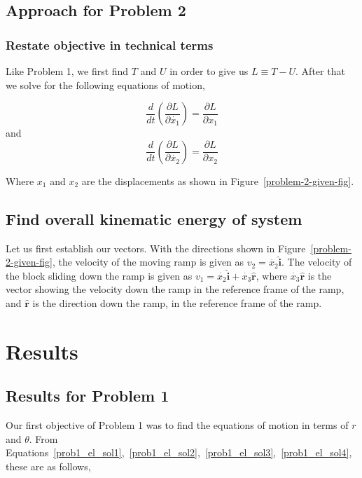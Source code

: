 \documentclass[conference]{IEEEtran}
\begin{document}
\subsection{Approach for Problem 2}

\subsubsection{Restate objective in technical terms}
Like Problem 1, we first find $T$ and $U$ in order to give us
$L \equiv T - U$. After that we solve for the following
equations of motion,

\begin{equation} \label{prob2_eq_motion_x1}
    \frac{d}{dt} \left(\frac{\partial L}{\partial \dot{x_1}}\right) = \frac{\partial L}{ \partial x_1}
\end{equation}
and
\begin{equation} \label{prob2_eq_motion_x2}
    \frac{d}{dt} \left(\frac{\partial L}{\partial \dot{x_2}}\right) = \frac{\partial L}{ \partial x_2}
\end{equation}

Where $x_1$ and $x_2$ are the displacements as shown in Figure~\ref{problem-2-given-fig}.

\subsection{Find overall kinematic energy of system}

Let us first establish our vectors. With the directions shown in Figure~\ref{problem-2-given-fig},
the velocity of the moving ramp is given as $v_2 = \dot{x_2} \hat{\textbf{i}}$. The
velocity of the block sliding down the ramp is given as $v_1 = \dot{x_2} \hat{\textbf{i}} + \dot{x_3}\hat{\textbf{r}}$,
where $\dot{x_3}\hat{\textbf{r}}$ is the vector showing the velocity down the ramp in the reference frame of the
ramp, and $\hat{\textbf{r}}$ is the direction down the ramp, in the reference frame of the ramp.

\section{Results}

\subsection{Results for Problem 1}

Our first objective of Problem 1 was to find the equations of motion in terms
of $r$ and $\theta$. From Equations~\ref{prob1_el_sol1},~\ref{prob1_el_sol2},~\ref{prob1_el_sol3},~\ref{prob1_el_sol4}, these are as follows,\\
\end{document}
